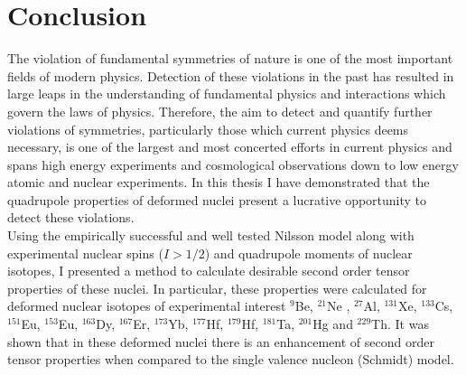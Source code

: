 \documentclass[10pt,a4paper, twoside, openright]{report}
\begin{document}
\chapter{Conclusion} \label{chap:P1Conc}
The violation of fundamental symmetries of nature is one of the most important fields of modern physics. Detection of these violations in the past has resulted in large leaps in the understanding of fundamental physics and interactions which govern the laws of physics. Therefore, the aim to detect and quantify further violations of symmetries, particularly those which current physics deems necessary, is one of the largest and most concerted efforts in current physics and spans high energy experiments and cosmological observations down to low energy atomic and nuclear experiments. In this thesis I have demonstrated that the quadrupole properties of deformed nuclei present a lucrative opportunity to detect these violations.\\
\linebreak
Using the empirically successful and well tested Nilsson model along with experimental nuclear spins ($I>1/2$) and quadrupole moments of nuclear isotopes, I presented a method to calculate desirable second order tensor properties of these nuclei. In particular, these properties were calculated for deformed nuclear isotopes of experimental interest $^{9}$Be, $^{21}$Ne , $^{27}$Al, $^{131}$Xe, $^{133}$Cs, $^{151}$Eu, $^{153}$Eu, $^{163}$Dy, $^{167}$Er, $^{173}$Yb, $^{177}$Hf, $^{179}$Hf, $^{181}$Ta, $^{201}$Hg and $^{229}$Th. It was shown that in these deformed nuclei there is an enhancement of second order tensor properties when compared to the single valence nucleon (Schmidt) model.\\
\linebreak
\end{document}
